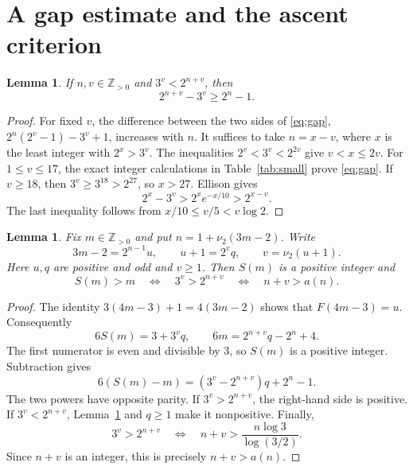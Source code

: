 \documentclass[11pt,a4paper]{amsart}
\newtheorem{lemma}[theorem]{Lemma}
\newcommand{\Npos}{\mathbb{Z}_{>0}}
\begin{document}
\newpage
\section{A gap estimate and the ascent criterion}

\begin{lemma}\label{lem:gap}
If \(n,v\in\Npos\) and \(3^v<2^{n+v}\), then
\begin{equation}\label{eq:gap}
  2^{n+v}-3^v\ge 2^n-1.
\end{equation}
\end{lemma}

\begin{proof}
For fixed \(v\), the difference between the two sides of \eqref{eq:gap},
\(2^n(2^v-1)-3^v+1\), increases with \(n\). It suffices to take
\(n=x-v\), where \(x\) is the least integer with \(2^x>3^v\).
The inequalities \(2^v<3^v<2^{2v}\) give \(v<x\le 2v\).
For \(1\le v\le17\), the exact integer calculations in
Table~\ref{tab:small} prove \eqref{eq:gap}. If \(v\ge18\), then
\(3^v\ge3^{18}>2^{27}\), so \(x>27\). Ellison
\cite[Theorem~3]{ellison} gives
\[
  2^x-3^v>2^x e^{-x/10}>2^{x-v}.
\]
The last inequality follows from \(x/10\le v/5<v\log 2\).
\end{proof}

\begin{lemma}\label{lem:criterion}
Fix \(m\in\Npos\) and put \(n=1+\nu_2(3m-2)\). Write
\[
  3m-2=2^{n-1}u,\qquad u+1=2^v q,\qquad
  v=\nu_2(u+1).
\]
Here \(u,q\) are positive and odd and \(v\ge1\). Then \(S(m)\) is a
positive integer and
\begin{equation}\label{eq:criterion}
  S(m)>m
  \quad\Longleftrightarrow\quad
  3^v>2^{n+v}
  \quad\Longleftrightarrow\quad
  n+v>a(n).
\end{equation}
\end{lemma}

\begin{proof}
The identity \(3(4m-3)+1=4(3m-2)\) shows that \(F(4m-3)=u\).
Consequently
\[
  6S(m)=3+3^v q,\qquad 6m=2^{n+v}q-2^n+4.
\]
The first numerator is even and divisible by \(3\), so \(S(m)\)
is a positive integer. Subtraction gives
\begin{equation}\label{eq:difference}
  6(S(m)-m)=(3^v-2^{n+v})q+2^n-1.
\end{equation}
The two powers have opposite parity. If \(3^v>2^{n+v}\), the right-hand
side is positive. If \(3^v<2^{n+v}\), Lemma~\ref{lem:gap} and \(q\ge1\)
make it nonpositive. Finally,
\[
  3^v>2^{n+v}
  \quad\Longleftrightarrow\quad
  n+v>\frac{n\log 3}{\log(3/2)}.
\]
Since \(n+v\) is an integer, this is precisely \(n+v>a(n)\).
\end{proof}
\end{document}
